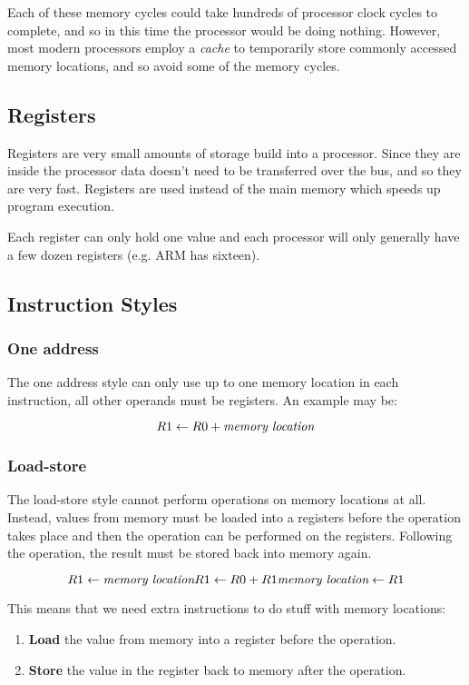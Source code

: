 \documentclass{article}
\begin{document}
Each of these memory cycles could take hundreds of processor clock cycles to complete, and so in this time the processor would be doing nothing. However, most modern processors employ a {\it cache} to temporarily store commonly accessed memory locations, and so avoid some of the memory cycles. 

\subsection{Registers}
Registers are very small amounts of storage build into a processor. Since they are inside the processor data doesn't need to be transferred over the bus, and so they are very fast. Registers are used instead of the main memory which speeds up program execution.

Each register can only hold one value and each processor will only generally have a few dozen registers (e.g. ARM has sixteen).

\subsection{Instruction Styles}

\subsubsection{One address}
The one address style can only use up to one memory location in each instruction, all other operands must be registers. An example may be:

\[
    R1 \leftarrow R0 + \textrm{\it memory location}
\]

\subsubsection{Load-store}
The load-store style cannot perform operations on memory locations at all. Instead, values from memory must be loaded into a registers before the operation takes place and then the operation can be performed on the registers. Following the operation, the result must be stored back into memory again.

\[
    R1 \leftarrow \textrm{\it memory location}\\
	R1 \leftarrow R0 + R1\\
    \textrm{\it memory location} \leftarrow R1
\]

This means that we need extra instructions to do stuff with memory locations:
\begin{enumerate}
	\item \textbf{Load} the value from memory into a register before the operation.
	\item \textbf{Store} the value in the register back to memory after the operation.
\end{enumerate}
\end{document}

